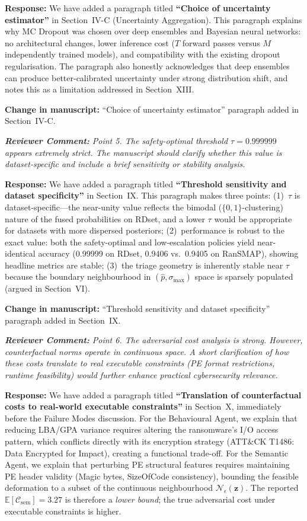 \documentclass[11pt,a4paper]{article}
\newcommand{\RC}[1]{\begin{reviewbox}\textit{\textbf{Reviewer Comment:} #1}\end{reviewbox}}
\newcommand{\RS}[1]{\noindent\textcolor{responsegreen}{\textbf{Response:}} #1\par\medskip}
\newcommand{\CH}[1]{\noindent\textcolor{changebrown}{\textbf{Change in manuscript:}} #1\par\bigskip}
\begin{document}
\RS{We have added a paragraph titled \textbf{``Choice of uncertainty estimator''}
in Section~IV-C (Uncertainty Aggregation). This paragraph explains why MC Dropout
was chosen over deep ensembles and Bayesian neural networks: no architectural
changes, lower inference cost ($T$ forward passes versus $M$ independently trained
models), and compatibility with the existing dropout regularisation. The paragraph
also honestly acknowledges that deep ensembles can produce better-calibrated
uncertainty under strong distribution shift, and notes this as a limitation addressed
in Section~XIII.}

\CH{``Choice of uncertainty estimator'' paragraph added in Section~IV-C.}

\RC{Point 5. The safety-optimal threshold $\tau = 0.999999$ appears extremely strict.
The manuscript should clarify whether this value is dataset-specific and include a
brief sensitivity or stability analysis.}

\RS{We have added a paragraph titled \textbf{``Threshold sensitivity and dataset
specificity''} in Section~IX. This paragraph makes three points: (1)~$\tau$ is
dataset-specific---the near-unity value reflects the bimodal ($\{0,1\}$-clustering)
nature of the fused probabilities on RDset, and a lower $\tau$ would be appropriate
for datasets with more dispersed posteriors; (2)~performance is robust to the exact
value: both the safety-optimal and low-escalation policies yield near-identical
accuracy (0.99999 on RDset, 0.9406 vs.\ 0.9405 on RanSMAP), showing headline metrics
are stable; (3)~the triage geometry is inherently stable near $\tau$ because the
boundary neighbourhood in $(\hat{p},\sigma_{\max})$ space is sparsely populated
(argued in Section~VI).}

\CH{``Threshold sensitivity and dataset specificity'' paragraph added in Section~IX.}

\RC{Point 6. The adversarial cost analysis is strong. However, counterfactual norms
operate in continuous space. A short clarification of how these costs translate to
real executable constraints (PE format restrictions, runtime feasibility) would
further enhance practical cybersecurity relevance.}

\RS{We have added a paragraph titled \textbf{``Translation of counterfactual costs
to real-world executable constraints''} in Section~X, immediately before the Failure
Modes discussion. For the Behavioural Agent, we explain that reducing LBA/GPA
variance requires altering the ransomware's I/O access pattern, which conflicts
directly with its encryption strategy (ATT\&CK T1486: Data Encrypted for Impact),
creating a functional trade-off. For the Semantic Agent, we explain that perturbing
PE structural features requires maintaining PE header validity (Magic bytes,
SizeOfCode consistency), bounding the feasible deformation to a subset of the
continuous neighbourhood $\mathcal{N}_\epsilon(\mathbf{z})$. The reported
$\mathbb{E}[\mathcal{C}_{\text{sem}}] = 3.27$ is therefore a \emph{lower bound};
the true adversarial cost under executable constraints is higher.}
\end{document}
